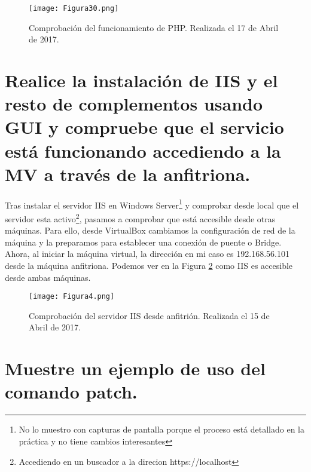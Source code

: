 \begin{figure}[H] 
\centering
\texttt{[image: Figura30.png]}  
\caption{Comprobación del funcionamiento de PHP. Realizada el 17 de Abril de 2017.} \label{fig:figura30}
\end{figure}



\section{Realice la instalación de IIS y el resto de complementos usando GUI y compruebe que el servicio está funcionando accediendo a la MV a través de la anfitriona.}

Tras instalar el servidor IIS en Windows Server\footnote{No lo muestro con capturas de pantalla porque el proceso está detallado en la práctica y no tiene cambios interesantes} 
y comprobar desde local que el servidor esta activo\footnote{Accediendo en un buscador a la direcion https://localhost},
pasamos a comprobar que está accesible desde otras máquinas. Para ello, desde VirtualBox cambiamos la configuración de red de la máquina y la preparamos para
establecer una conexión de puente o Bridge. Ahora, al iniciar la máquina virtual, la dirección en mi caso es 192.168.56.101 desde la máquina anfitriona. Podemos 
ver en la Figura \ref{fig:figura4} como IIS es accesible desde ambas máquinas.

\begin{figure}[H] 
\centering
\texttt{[image: Figura4.png]}  
\caption{Comprobación del servidor IIS desde anfitrión. Realizada el 15 de Abril de 2017.} \label{fig:figura4}
\end{figure}






\section{Muestre un ejemplo de uso del comando patch.}

